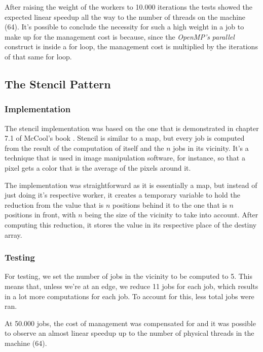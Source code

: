 \documentclass[10pt,journal]{IEEEtran}
\begin{document}
After raising the weight of the workers to 10.000 iterations the tests showed the expected linear speedup all the way to the number of threads on the machine (64). It's possible to conclude the necessity for such a high weight in a job to make up for the management cost is because, since the \textit{OpenMP's} \textit{parallel} construct is inside a for loop, the management cost is multiplied by the iterations of that same for loop.

\subsection{The Stencil Pattern}

\subsubsection{Implementation}

The stencil implementation was based on the one that is demonstrated in chapter 7.1 of McCool's book \cite{mccool}. Stencil is similar to a map, but every job is computed from the result of the computation of itself and the $ n $ jobs in its vicinity. It's a technique that is used in image manipulation software, for instance, so that a pixel gets a color that is the average of the pixels around it.

The implementation was straightforward as it is essentially a map, but instead of just doing it's respective worker, it creates a temporary variable to hold the reduction from the value that is $ n $ positions behind it to the one that is $ n $ positions in front, with $ n $ being the size of the vicinity to take into account. After computing this reduction, it stores the value in its respective place of the destiny array.

\subsubsection{Testing}

For testing, we set the number of jobs in the vicinity to be computed to 5. This means that, unless we're at an edge, we reduce 11 jobs for each job, which results in a lot more computations for each job. To account for this, less total jobs were ran.

At 50.000 jobs, the cost of management was compensated for and it was possible to observe an almost linear speedup up to the number of physical threads in the machine (64).
\end{document}

